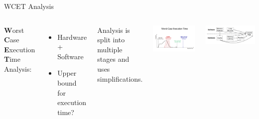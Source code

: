 \documentclass{beamer}
\begin{document}
\begin{frame}{WCET Analysis}
    \begin{columns}
        

    \textbf{W}orst \textbf{C}ase \textbf{E}xecution \textbf{T}ime Analysis:
    \begin{itemize}
        \item Hardware + Software
        \item Upper bound for execution time?
    \end{itemize}


    \begin{block}{}
        Analysis is split into multiple stages and uses simplifications.
    \end{block}


    \includegraphics[width=1\textwidth]{pic/WCET.png}

    \includegraphics[width=1\textwidth]{pic/wcet-deps.png}

    \end{columns}
\end{frame}

\end{document}
